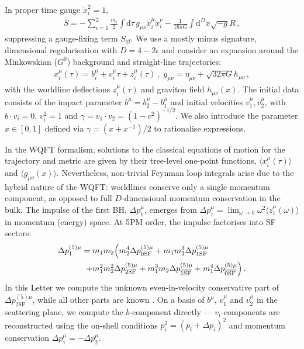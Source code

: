\documentclass[twocolumn,superscriptaddress,amsmath, amssymb, amsfonts,preprintnumbers,aps,prd,longbibliography,nofootinbib]{revtex4-2}
\def\d{\mathrm{d}}
\def\d{\mathrm{d}}
\def\nn{\nonumber}
\newcommand{\vev}[1]{\langle #1\rangle}
\newcommand{\widebar}{\overline}
\newcommand{\mn}{{\mu\nu}}
\begin{document}
In proper time gauge $\dot x_{i}^{2}=1$,
\begin{align}\label{eq:action}
S=-\sum_{i=1}^{2}\frac{m_i}2\int\!\d\tau\,g_{\mu\nu}\dot x_i^{\mu}\dot x_i^{\nu}
 - \frac{1}{16\pi G}\int\!\d^{D}x \sqrt{-g} R \, ,
\end{align}
suppressing a gauge-fixing term $S_{\text{gf}}$.
We use a mostly minus signature, dimensional regularisation with $D=4-2\epsilon$ and consider an expansion around the Minkowskian ($G^{0}$) background and straight-line trajectories:
\begin{align}\label{backgroundexp}
    x_i^\mu(\tau) = b_i^\mu \!+\! v_i^\mu \tau \!+\! z_i^\mu(\tau)\,,\,\,
    g_{\mu\nu} = \eta_{\mu\nu} +\sqrt{32\pi G} h_\mn \,,
\end{align}
with the  worldline deflections $z_i^\mu(\tau)$ and graviton field $h_\mn(x)$.
The initial data consists of the impact parameter $b^{\mu}=b_{2}^{\mu}-b_{1}^{\mu}$ and initial velocities $v^\mu_{1},v^\mu_{2}$, with $b\cdot v_i=0$, $v_i^2=1$ and $\gamma=v_1\cdot v_2=(1-v^{2})^{-1/2}$. We also introduce the parameter $x\in[0,1]$ defined via $\gamma=(x+x^{-1})/2$ to rationalise expressions.

In the WQFT formalism, solutions to the classical equations of motion for the trajectory and metric are given by their tree-level one-point functions,
$\vev{x^{\mu}_{i}(\tau)}$ and $\vev{g_{\mu\nu}(x)}$.
Nevertheless, non-trivial Feynman loop integrals arise due to the hybrid nature of the WQFT:
worldlines conserve only a single momentum component, as opposed to full $D$-dimensional momentum conservation in the bulk.
The impulse of the first BH, $\Delta p_{1}^{\mu}$, emerges from $\Delta p_{1}^{\mu} = \lim_{\omega\to 0}\omega^{2}\vev{z_{1}^{\mu}(\omega)}$ in momentum (energy) space.
At 5PM order, the impulse factorises into SF sectors:
\begin{align}\label{eq:sfExpansion}
\Delta p^{(5) \mu}_1=  m_{1} m_{2} & \Bigl ( m_2^{4} \Delta p^{(5) \mu}_{\text{0SF}}
+  m_1 m_2^3 \Delta p^{(5) \mu}_{\text{1SF}}   \\
+m_1^2 m_2^2 &\Delta p^{(5) \mu}_{\text{2SF}}
+ m_1^3 m_2 \Delta p^{(5) \mu}_{\widebar{\text{1SF}}}
 + m_1^4 \Delta p^{(5) \mu}_{\widebar{\text{0SF}}}\Bigr) \nn \,.
\end{align}
In this Letter we compute the unknown even-in-velocity conservative part of $\Delta p^{(5) \mu}_{\text{2SF}}$, while all other parts are known \cite{Driesse:2024xad,Driesse:2024feo}.
On a basis of $b^\mu$, $v_1^\mu$ and $v_2^\mu$ in the scattering plane, we compute the $b$-component directly ---
$v_i$-components are reconstructed using the on-shell conditions $p_i^2=(p_i+\Delta p_i)^2$ and momentum conservation $\Delta p_1^\mu=-\Delta p_2^\mu$.
\end{document}
